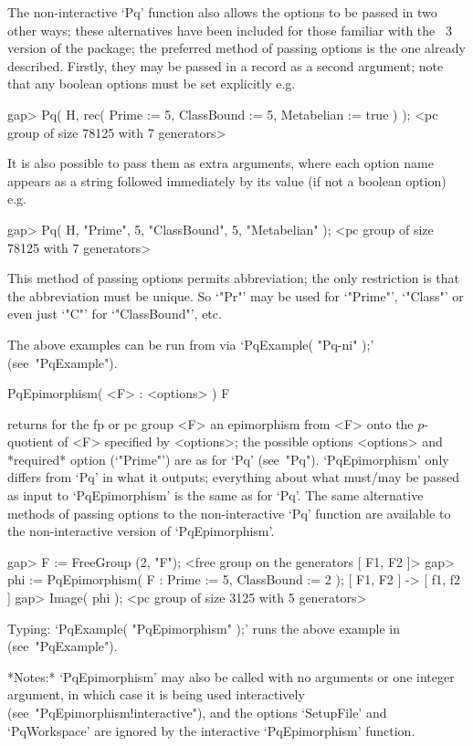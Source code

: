 The non-interactive `Pq' function also allows the options to be passed in
two other ways; these alternatives have been included for those  familiar
with the {\GAP}~3 version of the {\ANUPQ} package; the  preferred  method
of passing options is the one already described.  Firstly,  they  may  be
passed in a record as a second argument; note that  any  boolean  options
must be set explicitly e.g.

\beginexample
gap> Pq( H, rec( Prime := 5, ClassBound := 5, Metabelian := true ) );
<pc group of size 78125 with 7 generators>
\endexample

It is also possible to pass them as extra arguments,  where  each  option
name appears as a string followed immediately by  its  value  (if  not  a
boolean option) e.g.

\beginexample
gap> Pq( H, "Prime", 5, "ClassBound", 5, "Metabelian" );             
<pc group of size 78125 with 7 generators>
\endexample

This method of passing options permits abbreviation; the only restriction
is that the abbreviation must be  unique.  So  `"Pr"'  may  be  used  for
`"Prime"', `"Class"' or even just `"C"' for `"ClassBound"', etc.

The above examples can be run  from  {\GAP}  via  `PqExample( "Pq-ni" );'
(see~"PqExample").

\>PqEpimorphism( <F> : <options> ) F

returns for the fp or pc group <F>  an  epimorphism  from  <F>  onto  the
$p$-quotient  of  <F>  specified  by  <options>;  the  possible   options
<options> and *required* option (`"Prime"') are as for  `Pq'  (see~"Pq").
`PqEpimorphism' only differs from `Pq' in  what  it  outputs;  everything
about what must/may be passed as input to `PqEpimorphism' is the same  as
for `Pq'.  The  same  alternative  methods  of  passing  options  to  the
non-interactive  `Pq'  function  are  available  to  the  non-interactive
version of `PqEpimorphism'.

\beginexample
gap> F := FreeGroup (2, "F");
<free group on the generators [ F1, F2 ]>
gap> phi := PqEpimorphism( F : Prime := 5, ClassBound := 2 );
[ F1, F2 ] -> [ f1, f2 ]
gap> Image( phi );
<pc group of size 3125 with 5 generators>
\endexample

Typing: `PqExample( "PqEpimorphism" );' runs the above example in  {\GAP}
(see~"PqExample").

*Notes:* `PqEpimorphism' may also be called  with  no  arguments  or  one
integer  argument,  in  which  case  it  is  being   used   interactively
(see~"PqEpimorphism!interactive"),  and  the  options   `SetupFile'   and
`PqWorkspace' are ignored by the interactive `PqEpimorphism' function.

